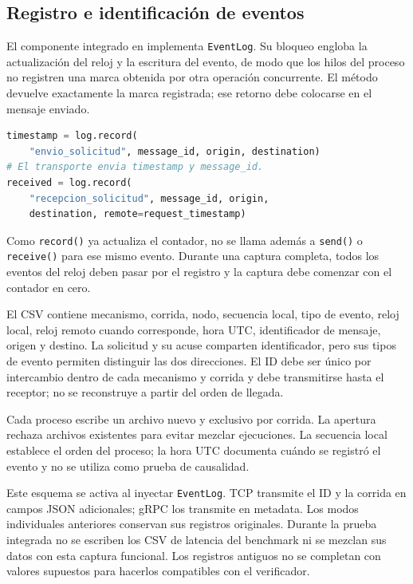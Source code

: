 \subsection{Registro e identificación de eventos}
El componente integrado en  implementa
\texttt{EventLog}. Su bloqueo engloba la actualización del reloj y la escritura
del evento, de modo que los hilos del proceso no registren una marca obtenida
por otra operación concurrente. El método devuelve exactamente la marca
registrada; ese retorno debe colocarse en el mensaje enviado.

\begin{lstlisting}[language=Python]
timestamp = log.record(
    "envio_solicitud", message_id, origin, destination)
# El transporte envia timestamp y message_id.
received = log.record(
    "recepcion_solicitud", message_id, origin,
    destination, remote=request_timestamp)
\end{lstlisting}

Como \texttt{record()} ya actualiza el contador, no se llama además a
\texttt{send()} o \texttt{receive()} para ese mismo evento. Durante una captura
completa, todos los eventos del reloj deben pasar por el registro y la captura
debe comenzar con el contador en cero.

El CSV contiene mecanismo, corrida, nodo, secuencia local, tipo de evento,
reloj local, reloj remoto cuando corresponde, hora UTC, identificador de
mensaje, origen y destino. La solicitud y su acuse comparten identificador,
pero sus tipos de evento permiten distinguir las dos direcciones. El ID debe
ser único por intercambio dentro de cada mecanismo y corrida y debe
transmitirse hasta el receptor; no se reconstruye a partir del orden de llegada.

Cada proceso escribe un archivo nuevo y exclusivo por corrida. La apertura
rechaza archivos existentes para evitar mezclar ejecuciones. La secuencia local
establece el orden del proceso; la hora UTC documenta cuándo se registró el
evento y no se utiliza como prueba de causalidad.

Este esquema se activa al inyectar \texttt{EventLog}. TCP transmite el ID y la
corrida en campos JSON adicionales; gRPC los transmite en metadata. Los modos
individuales anteriores conservan sus registros originales. Durante la prueba
integrada no se escriben los CSV de latencia del benchmark ni se mezclan sus
datos con esta captura funcional. Los registros antiguos no se completan con
valores supuestos para hacerlos compatibles con el verificador.

